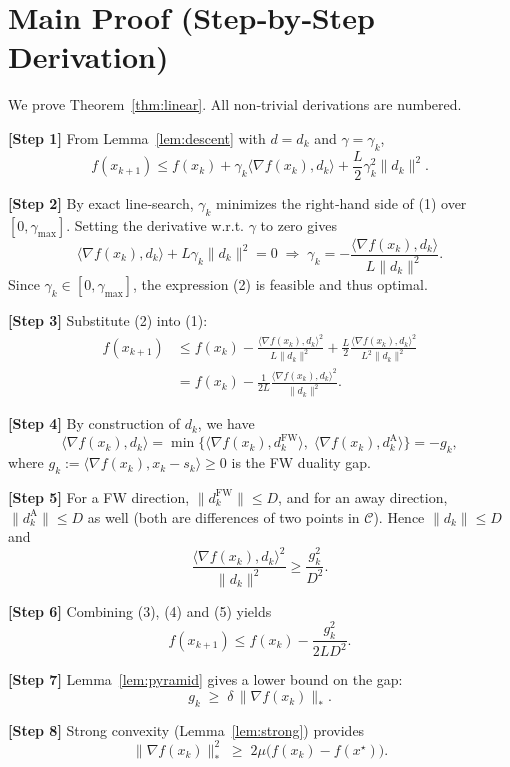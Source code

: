 \documentclass{article}
\begin{document}
\section*{Main Proof (Step‑by‑Step Derivation)}
We prove Theorem~\ref{thm:linear}.  All non‑trivial derivations are numbered.

\medskip
\noindent\textbf{[Step 1]}  From Lemma~\ref{lem:descent} with $d=d_k$ and $\gamma=\gamma_k$,
\[
f(x_{k+1})\le f(x_k)+\gamma_k\langle\nabla f(x_k),d_k\rangle
+\frac{L}{2}\gamma_k^{2}\|d_k\|^{2}.
\tag{1}
\]

\noindent\textbf{[Step 2]}  By exact line‑search, $\gamma_k$ minimizes the right‑hand side of (1)
over $[0,\gamma_{\max}]$.  Setting the derivative w.r.t. $\gamma$ to zero gives
\[
\langle\nabla f(x_k),d_k\rangle+L\gamma_k\|d_k\|^{2}=0
\;\Longrightarrow\;
\gamma_k=-\frac{\langle\nabla f(x_k),d_k\rangle}{L\|d_k\|^{2}}.
\tag{2}
\]
Since $\gamma_k\in[0,\gamma_{\max}]$, the expression (2) is feasible and thus optimal.

\noindent\textbf{[Step 3]}  Substitute (2) into (1):
\[
\begin{aligned}
f(x_{k+1})
&\le f(x_k)-\frac{\langle\nabla f(x_k),d_k\rangle^{2}}{L\|d_k\|^{2}}
+\frac{L}{2}\frac{\langle\nabla f(x_k),d_k\rangle^{2}}{L^{2}\|d_k\|^{2}}   \\
&= f(x_k)-\frac{1}{2L}\frac{\langle\nabla f(x_k),d_k\rangle^{2}}{\|d_k\|^{2}} .
\end{aligned}
\tag{3}
\]

\noindent\textbf{[Step 4]}  By construction of $d_k$, we have
\[
\langle\nabla f(x_k),d_k\rangle=\min\bigl\{\langle\nabla f(x_k),d^{\mathrm{FW}}_k\rangle,
\;\langle\nabla f(x_k),d^{\mathrm{A}}_k\rangle\bigr\}
=-g_k,
\tag{4}
\]
where $g_k:=\langle\nabla f(x_k),x_k-s_k\rangle\ge0$ is the FW duality gap.

\noindent\textbf{[Step 5]}  For a FW direction,
$\|d^{\mathrm{FW}}_k\|\le D$, and for an away direction,
$\|d^{\mathrm{A}}_k\|\le D$ as well (both are differences of two points in $\mathcal C$).
Hence $\|d_k\|\le D$ and
\[
\frac{\langle\nabla f(x_k),d_k\rangle^{2}}{\|d_k\|^{2}}
\ge\frac{g_k^{2}}{D^{2}}.
\tag{5}
\]

\noindent\textbf{[Step 6]}  Combining (3), (4) and (5) yields
\[
f(x_{k+1})\le f(x_k)-\frac{g_k^{2}}{2L D^{2}} .
\tag{6}
\]

\noindent\textbf{[Step 7]}  Lemma~\ref{lem:pyramid} gives a lower bound on the gap:
\[
g_k\;\ge\;\delta\,\|\nabla f(x_k)\|_{*}.
\tag{7}
\]

\noindent\textbf{[Step 8]}  Strong convexity (Lemma~\ref{lem:strong}) provides
\[
\|\nabla f(x_k)\|_{*}^{2}\;\ge\;2\mu\bigl(f(x_k)-f(x^{\star})\bigr).
\tag{8}
\]
\end{document}
